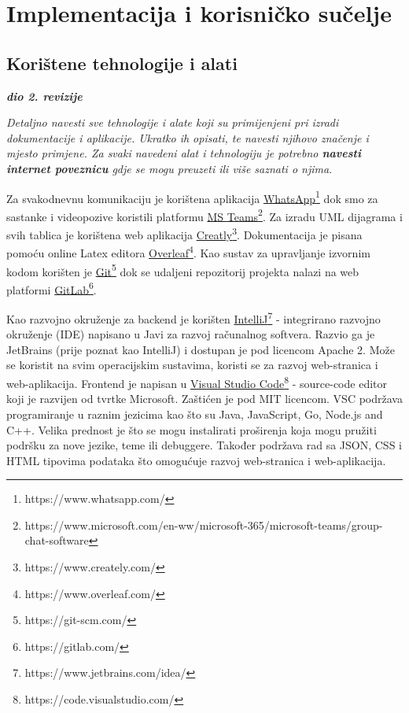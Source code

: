 \chapter{Implementacija i korisničko sučelje}
		
		
		\section{Korištene tehnologije i alati}
		
			\textbf{\textit{dio 2. revizije}}
			
			 \textit{Detaljno navesti sve tehnologije i alate koji su primijenjeni pri izradi dokumentacije i aplikacije. Ukratko ih opisati, te navesti njihovo značenje i mjesto primjene. Za svaki navedeni alat i tehnologiju je potrebno \textbf{navesti internet poveznicu} gdje se mogu preuzeti ili više saznati o njima}.
			
			
			\textit{}Za svakodnevnu komunikaciju je korištena aplikacija \underline{WhatsApp}\footnote[1]{https://www.whatsapp.com/} dok smo za sastanke i videopozive koristili platformu \underline{MS Teams}\footnote[2]{https://www.microsoft.com/en-ww/microsoft-365/microsoft-teams/group-chat-software}. Za izradu UML dijagrama i svih tablica je korištena web aplikacija \underline{Creatly}\footnote[3]{https://www.creately.com/}. Dokumentacija je pisana pomoću online Latex editora \underline{Overleaf}\footnote[4]{https://www.overleaf.com/}. Kao sustav za upravljanje izvornim kodom korišten je \underline{Git}\footnote[5]{https://git-scm.com/} dok se udaljeni repozitorij projekta nalazi na web platformi \underline{GitLab}\footnote[6]{https://gitlab.com/}.
			
			\textit{}Kao razvojno okruženje za backend je korišten \underline{IntelliJ}\footnote[7]{https://www.jetbrains.com/idea/} - integrirano razvojno okruženje (IDE) napisano u Javi za razvoj računalnog softvera. Razvio ga je JetBrains (prije poznat kao IntelliJ) i dostupan je pod licencom Apache 2. Može se koristit na svim operacijskim sustavima, koristi se za razvoj web-stranica i web-aplikacija. Frontend je napisan u \underline{Visual Studio Code}\footnote[8]{https://code.visualstudio.com/} - source-code editor koji je razvijen od tvrtke Microsoft. Zaštićen je pod MIT licencom. VSC podržava programiranje u raznim jezicima kao što su Java, JavaScript, Go, Node.js and C++. Velika prednost je što se mogu instalirati proširenja koja mogu pružiti podršku za nove jezike, teme ili debuggere. Također podržava rad sa JSON, CSS i HTML tipovima podataka što omogućuje razvoj web-stranica i web-aplikacija.
			
